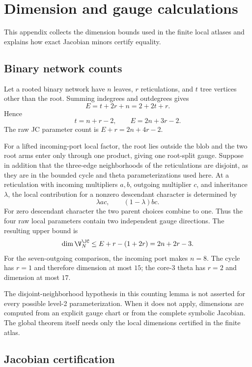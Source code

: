 \section{Dimension and gauge calculations}\label{app:dimensions}

This appendix collects the dimension bounds used in the finite local atlases and explains how exact Jacobian minors certify equality.

\subsection{Binary network counts}

Let a rooted binary network have $n$ leaves, $r$ reticulations, and $t$ tree vertices other than the root.  Summing indegrees and outdegrees gives
\[
E=t+2r+n=2+2t+r.
\]
Hence
\[
t=n+r-2,
\qquad
E=2n+3r-2.
\]
The raw JC parameter count is $E+r=2n+4r-2$.

For a lifted incoming-port local factor, the root lies outside the blob and the two root arms enter only through one product, giving one root-split gauge.  Suppose in addition that the three-edge neighborhoods of the reticulations are disjoint, as they are in the bounded cycle and theta parameterizations used here.  At a reticulation with incoming multipliers $a,b$, outgoing multiplier $c$, and inheritance $\lambda$, the local contribution for a nonzero descendant character is determined by
\[
\lambda ac,
\qquad
(1-\lambda)bc.
\]
For zero descendant character the two parent choices combine to one.  Thus the four raw local parameters contain two independent gauge directions.  The resulting upper bound is
\begin{equation}\label{eq:dimension-gauge-upper}
\dim \V_N^{\JC}
\le E+r-(1+2r)=2n+2r-3.
\end{equation}
For the seven-outgoing comparison, the incoming port makes $n=8$.  The cycle has $r=1$ and therefore dimension at most $15$; the core-3 theta has $r=2$ and dimension at most $17$.

The disjoint-neighborhood hypothesis in this counting lemma is not asserted for every possible level-2 parameterization.  When it does not apply, dimensions are computed from an explicit gauge chart or from the complete symbolic Jacobian.  The global theorem itself needs only the local dimensions certified in the finite atlas.

\subsection{Jacobian certification}

